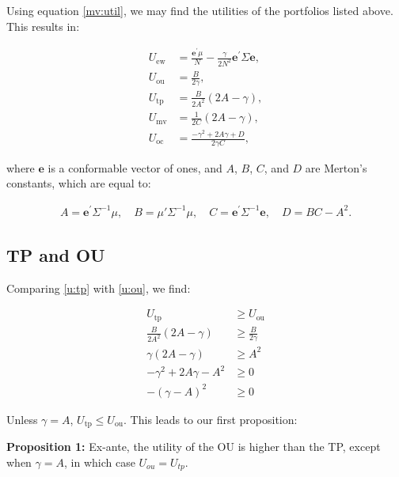 \documentclass[12pt,oneside,a4paper]{memoir}
\begin{document}
Using equation \eqref{mv:util}, we may find the utilities of the portfolios listed above.
This results in:

\begin{align}
	\label{u:ew}
	U_{\mathrm{ew}} &= \frac{\mathbf{e}^{\prime} \mu}{N} - \frac{\gamma}{2N^2} \mathbf{e}^{\prime}\Sigma \mathbf{e}, \\
	\label{u:ou}
	U_{\mathrm{ou}} &= \frac{B}{2\gamma},  \\
	\label{u:tp}
	U_{\mathrm{tp}} &= \frac{B}{2A^2} (2A - \gamma), \\
	\label{u:mv}
	U_{\mathrm{mv}} &= \frac{1}{2C} (2A- \gamma), \\
	\label{u:oc}
	U_{\mathrm{oc}} &= \frac{-\gamma^2 + 2A\gamma + D}{2\gamma C},
\end{align}

\noindent 
where $\mathbf{e}$ is a conformable vector of ones, and $A$, $B$, $C$, and $D$ are Merton's constants, which are equal to:

\vspace{-1 em}
\begin{align}
	\label{merton:cte}
	A = \mathbf{e}^{\prime}\Sigma^{-1}\mu, \quad
	B = \mu'\Sigma^{-1}\mu,\quad
	C = \mathbf{e}^{\prime}\Sigma^{-1}\mathbf{e}, \quad
	D = BC - A^2.
\end{align}

\subsection*{TP and OU}

Comparing \eqref{u:tp} with \eqref{u:ou}, we find:

\begin{align*}
U_{\mathrm{tp}} & \geq U_{\mathrm{ou}}
\\
\frac{B}{2A^2} (2A - \gamma) & \geq	\frac{B}{2\gamma}  
\\
\gamma (2A - \gamma) & \geq	A^2  
\\
-\gamma^2 + 2A\gamma - A^2 & \geq 0
\\
-(\gamma - A)^2 & \geq 0
\end{align*}

\noindent
Unless $\gamma = A$, $U_{\mathrm{tp}}  \leq U_{\mathrm{ou}}$.
This leads to our first proposition:

\noindent
\textbf{Proposition 1:}
Ex-ante, the utility of the OU is higher than the TP, except when $\gamma = A$, in which case $U_{ou}=U_{tp}$. \\
\end{document}
